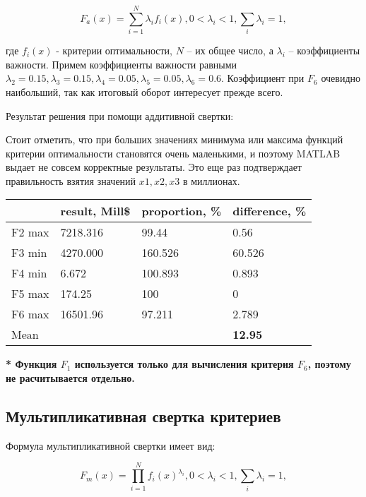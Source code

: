 \documentclass[14pt,a4paper,report]{report}
\begin{document}
\begin{equation*}
\text{$F_a(x)=\sum_{i=1}^{N}\lambda_if_i(x), 0<\lambda_i<1,\sum_{i}^{}\lambda_i=1,$}
\end{equation*}

где $f_i(x)$ - критерии оптимальности, $N$ – их общее число, а $\lambda_i$ -- коэффициенты важности. Примем коэффициенты важности равными $\lambda_2=0.15, \lambda_3=0.15, \lambda_4=0.05, \lambda_5=0.05, \lambda_6=0.6$. Коэффициент при $F_6$ очевидно наибольший, так как итоговый оборот интересует прежде всего.



Результат решения при помощи аддитивной свертки:



Стоит отметить, что при больших значениях минимума или максима функций критерии оптимальности становятся очень маленькими, и поэтому MATLAB выдает не совсем корректные результаты. Это еще раз подтверждает правильность взятия значений $x1, x2, x3$ в миллионах.

\begin{table}[h!]
	\centering
	\bgroup
	\def\arraystretch{1}
	\begin{tabular}{ | m{1.2cm} | m{1.9cm} | m{2.2cm} | m{2.2cm} | }
		\hline
		& result, Mill\$ & proportion, \% & difference, \% \\ \hline
		F2 max & 7218.316 & 99.44 & 0.56 \\ \hline
		F3 min & 4270.000 & 160.526 & 60.526 \\ \hline
		F4 min & 6.672 & 100.893 & 0.893 \\ \hline
		F5 max & 174.25 & 100 & 0 \\ \hline
		F6 max & 16501.96 & 97.211 & 2.789 \\ \hline
		Mean & & & \textbf{12.95} \\
		\hline
	\end{tabular}
	\egroup
\end{table}

\textbf{* Функция $F_1$ используется только для вычисления критерия $F_6$, поэтому не расчитывается отдельно.}

\subsection{Мультипликативная свертка критериев}

Формула мультипликативной свертки имеет вид:

\begin{equation*}
\text{$F_m(x)=\prod_{i=1}^{N}f_i(x)^{\lambda_i}, 0<\lambda_i<1,\sum_{i}^{}\lambda_i=1,$}
\end{equation*}
\end{document}
